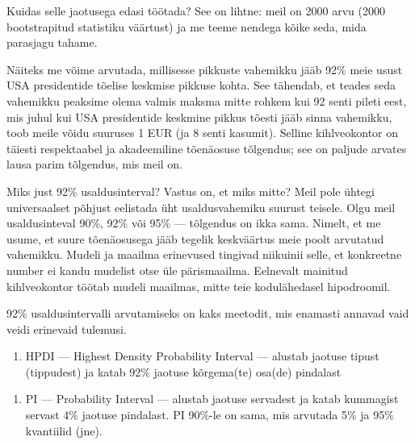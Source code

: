 \documentclass[]{book}
\newenvironment{Shaded}{\begin{snugshade}}{\end{snugshade}}
\newcommand{\KeywordTok}[1]{\textcolor[rgb]{0.13,0.29,0.53}{\textbf{#1}}}
\newcommand{\DataTypeTok}[1]{\textcolor[rgb]{0.13,0.29,0.53}{#1}}
\newcommand{\FloatTok}[1]{\textcolor[rgb]{0.00,0.00,0.81}{#1}}
\newcommand{\CommentTok}[1]{\textcolor[rgb]{0.56,0.35,0.01}{\textit{#1}}}
\newcommand{\OperatorTok}[1]{\textcolor[rgb]{0.81,0.36,0.00}{\textbf{#1}}}
\newcommand{\NormalTok}[1]{#1}
\providecommand{\tightlist}{%
  \setlength{\itemsep}{0pt}\setlength{\parskip}{0pt}}
\begin{document}
Kuidas selle jaotusega edasi töötada? See on lihtne: meil on 2000 arvu
(2000 bootstrapitud statistiku väärtust) ja me teeme nendega kõike seda,
mida parasjagu tahame.

Näiteks me võime arvutada, millisesse pikkuste vahemikku jääb 92\% meie
usust USA presidentide tõelise keskmise pikkuse kohta. See tähendab, et
teades seda vahemikku peaksime olema valmis maksma mitte rohkem kui 92
senti pileti eest, mis juhul kui USA presidentide keskmine pikkus tõesti
jääb sinna vahemikku, toob meile võidu suuruses 1 EUR (ja 8 senti
kasumit). Selline kihlveokontor on täiesti respektaabel ja akadeemiline
tõenäosuse tõlgendus; see on paljude arvates lausa parim tõlgendus, mis
meil on.

Miks just 92\% usaldusinterval? Vastus on, et miks mitte? Meil pole
ühtegi universaalset põhjust eelistada üht usaldusvahemiku suurust
teisele. Olgu meil usaldusinteval 90\%, 92\% või 95\% --- tõlgendus on
ikka sama. Nimelt, et me usume, et suure tõenäosusega jääb tegelik
keskväärtus meie poolt arvutatud vahemikku. Mudeli ja maailma erinevused
tingivad niikuinii selle, et konkreetne number ei kandu mudelist otse
üle pärismaailma. Eelnevalt mainitud kihlveokontor töötab mudeli
maailmas, mitte teie kodulähedasel hipodroomil.

92\% usaldusintervalli arvutamiseks on kaks meetodit, mis enamasti
annavad vaid veidi erinevaid tulemusi.

\begin{enumerate}
\def\labelenumi{\arabic{enumi}.}
\tightlist
\item
  HPDI --- Highest Density Probability Interval --- alustab jaotuse
  tipust (tippudest) ja katab 92\% jaotuse kõrgema(te) osa(de) pindalast
\end{enumerate}

\begin{Shaded}
\end{Shaded}

\begin{enumerate}
\def\labelenumi{\arabic{enumi}.}
\setcounter{enumi}{1}
\tightlist
\item
  PI --- Probability Interval --- alustab jaotuse servadest ja katab
  kummagist servast 4\% jaotuse pindalast. PI 90\%-le on sama, mis
  arvutada 5\% ja 95\% kvantiilid (jne).
\end{enumerate}
\end{document}
